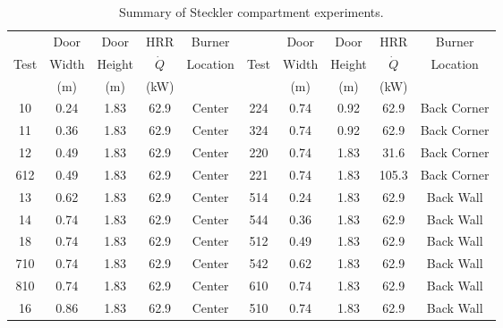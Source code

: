 \begin{table}[h!]
\caption{Summary of Steckler compartment experiments.}
\begin{center}
\begin{tabular}{|c|c|c|c|c||c|c|c|c|c|}
\hline
        & Door      & Door          &  HRR       & Burner       &       & Door      & Door        &  HRR         & Burner        \\
Test    & Width     & Height        & $\dot{Q}$  & Location     & Test  & Width     & Height      & $\dot{Q}$    & Location      \\
        & (m)       & (m)           & (kW)       &              &       & (m)       &  (m)        & (kW)         &                \\ \hline \hline
10      & 0.24      & 1.83          &  62.9      & Center       & 224   & 0.74      & 0.92        &  62.9         & Back Corner         \\ \hline
11      & 0.36      & 1.83          &  62.9      & Center       & 324   & 0.74      & 0.92        &  62.9         & Back Corner         \\ \hline
12      & 0.49      & 1.83          &  62.9      & Center       & 220   & 0.74      & 1.83        &  31.6         & Back Corner         \\ \hline
612     & 0.49      & 1.83          &  62.9      & Center       & 221   & 0.74      & 1.83        &  105.3        & Back Corner         \\ \hline
13      & 0.62      & 1.83          &  62.9      & Center       & 514   & 0.24      & 1.83        &  62.9         & Back Wall           \\ \hline
14      & 0.74      & 1.83          &  62.9      & Center       & 544   & 0.36      & 1.83        &  62.9         & Back Wall           \\ \hline
18      & 0.74      & 1.83          &  62.9      & Center       & 512   & 0.49      & 1.83        &  62.9         & Back Wall           \\ \hline
710     & 0.74      & 1.83          &  62.9      & Center       & 542   & 0.62      & 1.83        &  62.9         & Back Wall           \\ \hline
810     & 0.74      & 1.83          &  62.9      & Center       & 610   & 0.74      & 1.83        &  62.9         & Back Wall           \\ \hline
16      & 0.86      & 1.83          &  62.9      & Center       & 510   & 0.74      & 1.83        &  62.9         & Back Wall           \\ \hline

\end{tabular}
\end{center}
\end{table}
